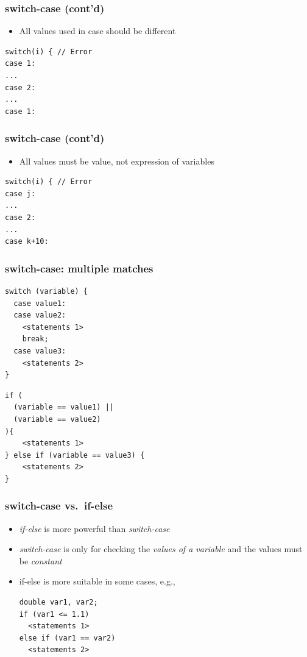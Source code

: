 \documentclass{../c-lecture}
\begin{document}
\begin{frame}[fragile]
  \frametitle{switch-case (cont’d)}
  \begin{itemize}
    \item All values used in case should be different
  \end{itemize}
  \begin{verbatim}
switch(i) { // Error
case 1:
...
case 2:
...
case 1:
  \end{verbatim}
\end{frame}

\begin{frame}[fragile]
  \frametitle{switch-case (cont’d)}
  \begin{itemize}
    \item All values must be value, not expression of variables
  \end{itemize}
  \scriptsize
  \begin{verbatim}
switch(i) { // Error
case j:
...
case 2:
...
case k+10:
  \end{verbatim}
\end{frame}

\begin{frame}[fragile]
  \frametitle{switch-case: multiple matches}
  \scriptsize
  \begin{verbatim}
switch (variable) {
  case value1:
  case value2:
    <statements 1>
    break;
  case value3:
    <statements 2>
}
  \end{verbatim}
  \scriptsize
  \begin{verbatim}
if (
  (variable == value1) ||
  (variable == value2)
){
    <statements 1>
} else if (variable == value3) {
    <statements 2>
}
  \end{verbatim}
\end{frame}

\begin{frame}[fragile]
  \frametitle{switch-case vs.\ if-else}
  \begin{itemize}
    \item
      \textit{\color{Orange} if-else} is more powerful than
      \textit{\color{Orange} switch-case}

    \item
      \textit{\color{LimeGreen} switch-case} is only for checking the
      \textit{\color{LimeGreen} values of a variable} and the values must be
      \textit{\color{LimeGreen} constant}

    \item if-else is more suitable in some cases, e.g.,
    \begin{verbatim}
double var1, var2;
if (var1 <= 1.1)
  <statements 1>
else if (var1 == var2)
  <statements 2>
    \end{verbatim}
  \end{itemize}
\end{frame}
\end{document}
